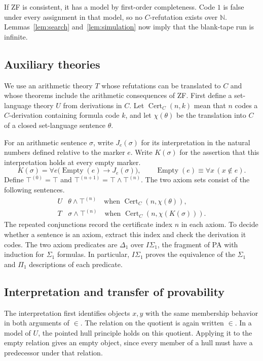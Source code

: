 \documentclass[11pt,letterpaper]{article}
\newcommand{\N}{\mathbb{N}}
\begin{document}
If ZF is consistent, it has a model by first-order completeness.
Code $1$ is false under every assignment in that model, so no
$C$-refutation exists over $\N$. Lemmas~\ref{lem:search}
and~\ref{lem:simulation} now imply that the blank-tape run is infinite.

\subsection{Auxiliary theories}

We use an arithmetic theory $T$ whose refutations can be translated
to $C$ and whose theorems include the arithmetic consequences of ZF.
First define a set-language theory $U$ from derivations in $C$.
Let $\operatorname{Cert}_C(n,k)$ mean that $n$ codes a $C$-derivation
containing formula code $k$, and let $\chi(\theta)$ be the
translation into $C$ of a closed set-language sentence $\theta$.

For an arithmetic sentence $\sigma$, write $J_e(\sigma)$ for its
interpretation in the natural numbers defined relative to the marker
$e$. Write $K(\sigma)$ for the assertion that this interpretation
holds at every empty marker.
\[
  K(\sigma)=\forall e\bigl(\operatorname{Empty}(e)\to J_e(\sigma)\bigr),
  \qquad
  \operatorname{Empty}(e)\equiv\forall x\,(x\notin e).
\]
Define $\top^{(0)}=\top$ and $\top^{(n+1)}=\top\land\top^{(n)}$.
The two axiom sets consist of the following sentences.
\[
\begin{array}{ll}
 U & \theta\land\top^{(n)}
     \quad\text{when }\operatorname{Cert}_C(n,\chi(\theta)),\\[2pt]
 T & \sigma\land\top^{(n)}
     \quad\text{when }\operatorname{Cert}_C(n,\chi(K(\sigma))).
\end{array}
\]
The repeated conjunctions record the certificate index $n$ in each
axiom. To decide whether a sentence is an axiom, extract this index
and check the derivation it codes. The two axiom predicates are
$\Delta_1$ over $I\Sigma_1$, the fragment of PA with induction for
$\Sigma_1$ formulas. In particular, $I\Sigma_1$ proves the
equivalence of the $\Sigma_1$ and $\Pi_1$ descriptions of each
predicate.

\subsection{Interpretation and transfer of provability}

The interpretation first identifies objects $x,y$ with the same
membership behavior in both arguments of $\in$. The relation on
the quotient is again written $\in$. In a model of $U$, the
pointed hull principle holds on this quotient. Applying it to
the empty relation gives an empty object, since every member of
a hull must have a predecessor under that relation.
\end{document}
